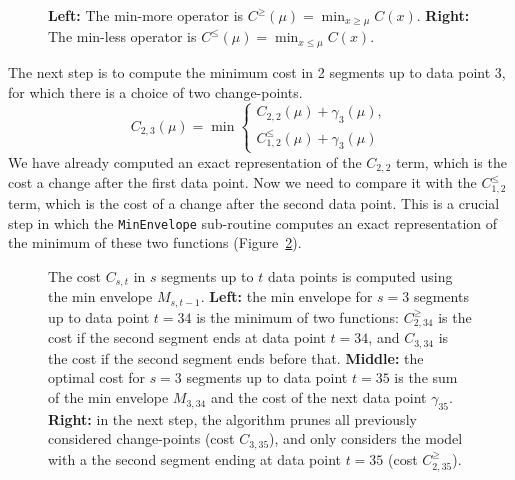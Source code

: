 \documentclass{article}
\begin{document}
\begin{figure}[!t]
  \parbox{3in}{
    \begin{center}
    
    \end{center}
  }
  \parbox{3in}{
    \begin{center}
      
    \end{center}
  }
  \caption{\label{fig:min-operators} \textbf{Left:} The min-more
    operator is $C^{\geq}(\mu)=\min_{x\geq \mu}C(x)$. \textbf{Right:}
    The min-less operator is $C^{\leq}(\mu)=\min_{x\leq
      \mu}C(x)$.}
\end{figure}

The next step is to compute the minimum cost in 2 segments up to data
point 3, for which there is a choice of two change-points.
\begin{equation*}
  C_{2,3}(\mu) = \min
  \begin{cases}
    C_{2,2}(\mu)+\gamma_3(\mu), \\
    C_{1,2}^{\leq}(\mu)+\gamma_3(\mu)
  \end{cases}
\end{equation*}
We have already computed an exact representation of the $C_{2,2}$
term, which is the cost a change after the first data point. Now we
need to compare it with the $C_{1,2}^{\leq}$ term, which is the cost
of a change after the second data point. This is a crucial step in
which the \texttt{MinEnvelope} sub-routine computes an exact
representation of the minimum of these two functions
(Figure~\ref{fig:min-envelope}).

\begin{figure}[!t]
  \begin{center}
    
  \end{center}
  \caption{\label{fig:min-envelope} The cost $C_{s,t}$ in $s$ segments
    up to $t$ data points is computed using the min envelope
    $M_{s,t-1}$. \textbf{Left:} the min envelope for $s=3$ segments up
    to data point $t=34$ is the minimum of two functions:
    $C^{\geq}_{2,34}$ is the cost if the second segment ends at data
    point $t=34$, and $C_{3,34}$ is the cost if the second segment
    ends before that. \textbf{Middle:} the optimal cost for $s=3$
    segments up to data point $t=35$ is the sum of the min envelope
    $M_{3,34}$ and the cost of the next data point
    $\gamma_{35}$. \textbf{Right:} in the next step, the
    algorithm prunes all previously considered change-points (cost
    $C_{3,35}$), and only considers the model with a the second segment
    ending at data point $t=35$ (cost $C^{\geq}_{2,35}$).}
\end{figure}
\end{document}
